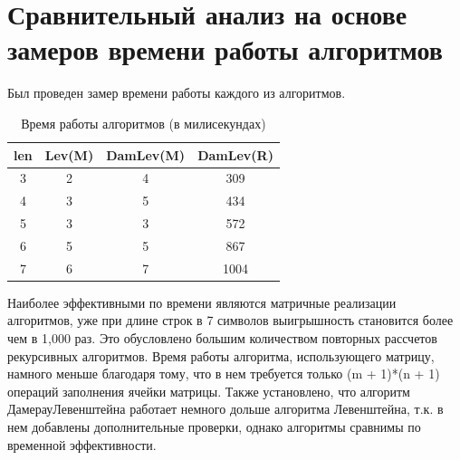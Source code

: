 \documentclass[12pt]{report}
\begin{document}
\section{Сравнительный анализ на основе замеров времени работы алгоритмов}

Был проведен замер времени работы каждого из алгоритмов.


\begin{table} [h!]
\centering
\caption{Время работы алгоритмов (в милисекундах)}
	\begin{tabular}{|c c c c|} 
 	\hline
	len & Lev(M) & DamLev(M)  & DamLev(R) \\ [0.8ex] 
 	\hline\hline
 	3 & 2 & 4 & 309\\
 	\hline
 	4 & 3 & 5 & 434\\
 	\hline
	5 & 3 & 3 & 572\\
	\hline
	6 & 5 & 5 & 867\\
	\hline
	7 & 6 & 7 & 1004\\
	\hline
	\end{tabular}
\end{table}




\par
Наиболее эффективными по времени являются матричные реализации алгоритмов, уже при длине строк в 7 символов выигрышность становится более чем в 1,000 раз. Это обусловлено большим количеством повторных рассчетов рекурсивных алгоритмов. Время работы алгоритма, использующего матрицу, намного меньше благодаря тому, что в нем требуется только (m + 1)*(n + 1) операций заполнения ячейки матрицы. Также установлено, что алгоритм ДамерауЛевенштейна работает немного дольше алгоритма Левенштейна, т.к. в нем добавлены дополнительные проверки, однако алгоритмы сравнимы по временной эффективности.
\end{document}
